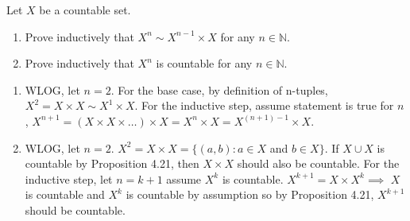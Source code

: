 \documentclass[12pt,letterpaper,boxed]{hmcpset}
\begin{document}
\begin{problem}[Exercise 4.22.]
Let $X$ be a countable set. 
\vspace{-2mm}
\begin{enumerate}
	\itemsep0em
	\item Prove inductively that $X^{n}\sim X^{n-1} \times X$ for any $n \in \mathbb{N}$.
	\item Prove inductively that $X^{n}$ is countable for any $n \in \mathbb{N}$.
\end{enumerate}
\end{problem}
\begin{solution}
\begin{enumerate}
	\itemsep0em
	\item WLOG, let $n=2.$ For the base case, by definition of n-tuples, $X^{2}=X\times X \sim X^{1}\times X$. For the inductive step, assume statement is true for $n$, $X^{n+1}=(X \times X \times \dots)\times X = X^{n}\times X = X^{(n + 1)-1}\times X.$
	\item WLOG, let $n=2.$ $X^{2}=X\times X=\{ (a,b) : a \in X$ and $ b \in X \}$. If $X \cup X$ is countable by Proposition 4.21, then $X\times X$ should also be countable. For the inductive step, let $n=k + 1$ assume $X^{k}$ is countable. $X^{k+1}=X \times X^{k}\implies$ $X$ is countable and $X^{k}$ is countable by assumption so by Proposition 4.21, $X^{k+1}$ should be countable.
\end{enumerate}
\end{solution}
\end{document}
